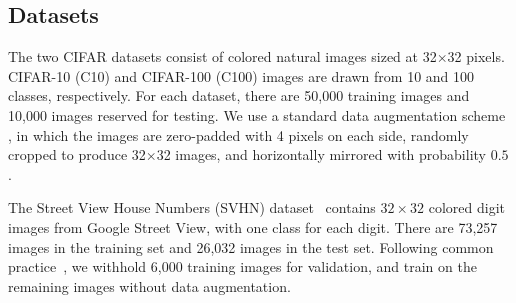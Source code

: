 


\subsection{Datasets}
The two CIFAR datasets \citep{cifar} consist of colored natural images sized at 32$\times$32 pixels. CIFAR-10 (C10) and CIFAR-100 (C100) images are drawn from 10 and 100 classes, respectively.
For each dataset, there are 50,000 training images and 10,000 images reserved for testing. %
We use a standard data augmentation scheme \citep{netinnet, fitnet, dsn, allcnn, highway, stochastic, fractalnet}, in which the images are zero-padded with 4 pixels on each side, randomly cropped to produce 32$\times$32 images, and horizontally mirrored with probability $0.5$.


The Street View House Numbers (SVHN) dataset~\citep{svhn} contains $32\times32$ colored digit images from Google Street View, with one class for each digit. There are 73,257 images in the training set and 26,032 images in the test set. Following common practice~\citep{sermanet2012convolutional, maxout, huang2016densely}, we withhold 6,000 training images for validation, and train on the remaining images without data augmentation.

